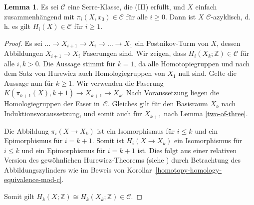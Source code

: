 \documentclass[11pt, a4paper, german]{article}
\theoremstyle{definition}
\newtheorem{lem}{Lemma}
\theoremstyle{remark}
\newcommand{\Z}{\mathbb{Z}} %
\newcommand{\SC}{\mathcal{C}} %
\renewcommand{\dh}{d.\,h.} %
\begin{document}
\begin{lem}\label{homotopy-in-c-implies-homology-in-c}
  Es sei $\SC$ eine Serre-Klasse, die (III) erfüllt, und
  $X$ einfach zusammenhängend mit $\pi_i(X, x_0) \in \SC$ für alle $i \geq 0$.
  Dann ist $X$ $\SC$-azyklisch, \dh{} es gilt $H_i(X) \in \SC$ für $i \geq 1$.
\end{lem}

\begin{proof}
  Es sei $\ldots \to X_{i+1} \to X_i \to \ldots \to X_1$ ein Postnikov-Turm von $X$, dessen Abbildungen $X_{i+1} \to X_i$ Faserungen sind.
  Wir zeigen, dass $H_i(X_k; \Z) \in \SC$ für alle $i, k > 0$.
  Die Aussage stimmt für $k = 1$, da alle Homotopiegruppen und nach dem Satz von Hurewicz auch Homologiegruppen von $X_1$ null sind.
  Gelte die Aussage nun für $k \geq 1$.
  Wir verwenden die Faserung $K(\pi_{k+1}(X), k{+}1) \to X_{k+1} \to X_k$.
  Nach Voraussetzung liegen die Homologiegruppen der Faser in~$\SC$.
  Gleiches gilt für den Basisraum $X_k$ nach Induktionsvoraussetzung,
  und somit auch für $X_{k+1}$ nach Lemma \ref{two-of-three}.

  Die Abbildung $\pi_i(X \to X_k)$ ist ein Isomorphismus für $i \leq k$ und ein Epimorphismus für $i = k+1$.
  Somit ist $H_i(X \to X_k)$ ein Isomorphismus für $i \leq k$ und ein Epimorphismus für $i = k+1$ ist.
  Dies folgt aus einer relativen Version des gewöhnlichen Hurewicz-Theorems (siehe \cite[\mbox{} Thm 4.32]{hatcher:at}) durch Betrachtung des Abbildungszylinders wie im Beweis von Korollar~\ref{homotopy-homology-equivalence-mod-c}.

  Somit gilt $H_k(X; \Z) \cong H_k(X_k; \Z) \in \SC$.
\end{proof}
\end{document}
